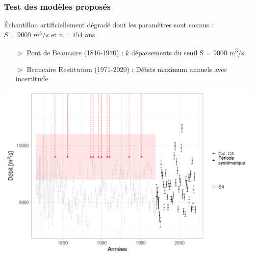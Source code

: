 \documentclass[compress,9pt]{beamer}
\begin{document}
	\begin{frame}[c]
		\frametitle{Test des modèles proposés}
		\vfill
		Échantillon artificiellement dégradé dont les paramètres sont connus :\\
		\vspace{5pt}
		$S = 9000$ $m^3/s$ et $n = 154$ ans\\
		\vfill
		\begin{itemize}
			\item [$\vartriangleright$] Pont de Beaucaire (1816-1970) : $k$ dépassements du seuil S = 9000 m\textsuperscript{3}/s
			\vspace{5pt}			
			\item [$\vartriangleright$] Beaucaire Restitution (1971-2020) : Débits maximum annuels avec incertitude
		\end{itemize}
		\vfill
		\centering
		\includegraphics[width = .7\textwidth]{./Figures/EchMixteDegrad.pdf} 
		\vfill
	\end{frame}
	
\end{document}
